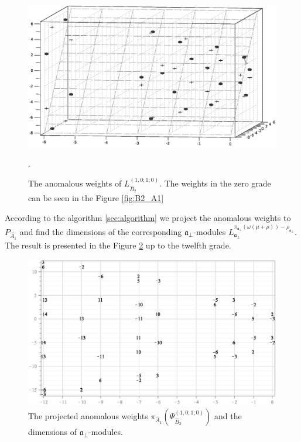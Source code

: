 \documentclass[12pt]{iopart}
\theoremstyle{definition}
\theoremstyle{definition}
\theoremstyle{definition}
\begin{document}
\begin{figure}[h!tb]
  \includegraphics[width=140mm]{figure11.eps}
  \caption{The anomalous weights of $L^{(1,0;1;0)}_{\hat B_2 }$.
  The weights in the zero grade can be seen in the Figure \ref{fig:B2_A1}}.
  \label{fig:affine_B2_anom_point}
\end{figure}

According to the algorithm \ref{sec:algorithm} we project the anomalous weights to
$P_{\hat{A_1}}$ and find the dimensions of the corresponding
$\mathfrak{a}_{\bot}$-modules $L^{\pi_{\mathfrak{a}_{\bot}}(\omega(\mu+\rho))-\rho_{\mathfrak{a}_{\bot}}}_{\mathfrak{a}_{\bot}}$.
The result is presented in the Figure
\ref{fig:AffineB2_A1_anom_proj} up to the twelfth grade.
\begin{figure}[h!tb]
  \centering
  \includegraphics[width=120mm]{figure12.eps}
  \caption{The projected anomalous weights $\pi_{\hat A_1}\left(\Psi^{(1,0;1;0)}_{\hat B_2}\right)$ and the dimensions of $\mathfrak{a}_{\bot}$-modules.}
  \label{fig:AffineB2_A1_anom_proj}
\end{figure}
\end{document}
